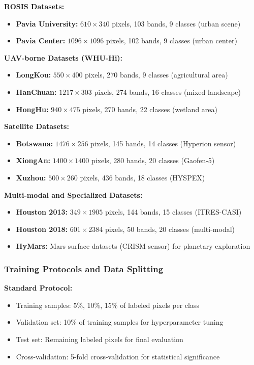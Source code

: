 \documentclass[journal]{IEEEtran}
\begin{document}
\textbf{ROSIS Datasets:}
\begin{itemize}
\item \textbf{Pavia University:} $610 \times 340$ pixels, 103 bands, 9 classes (urban scene)
\item \textbf{Pavia Center:} $1096 \times 1096$ pixels, 102 bands, 9 classes (urban center)
\end{itemize}

\textbf{UAV-borne Datasets (WHU-Hi):}
\begin{itemize}
\item \textbf{LongKou:} $550 \times 400$ pixels, 270 bands, 9 classes (agricultural area)
\item \textbf{HanChuan:} $1217 \times 303$ pixels, 274 bands, 16 classes (mixed landscape)
\item \textbf{HongHu:} $940 \times 475$ pixels, 270 bands, 22 classes (wetland area)
\end{itemize}

\textbf{Satellite Datasets:}
\begin{itemize}
\item \textbf{Botswana:} $1476 \times 256$ pixels, 145 bands, 14 classes (Hyperion sensor)
\item \textbf{XiongAn:} $1400 \times 1400$ pixels, 280 bands, 20 classes (Gaofen-5)
\item \textbf{Xuzhou:} $500 \times 260$ pixels, 436 bands, 18 classes (HYSPEX)
\end{itemize}

\textbf{Multi-modal and Specialized Datasets:}
\begin{itemize}
\item \textbf{Houston 2013:} $349 \times 1905$ pixels, 144 bands, 15 classes (ITRES-CASI)
\item \textbf{Houston 2018:} $601 \times 2384$ pixels, 50 bands, 20 classes (multi-modal)
\item \textbf{HyMars:} Mars surface datasets (CRISM sensor) for planetary exploration
\end{itemize}

\subsubsection{Training Protocols and Data Splitting}

\textbf{Standard Protocol:}
\begin{itemize}
\item Training samples: 5\%, 10\%, 15\% of labeled pixels per class
\item Validation set: 10\% of training samples for hyperparameter tuning
\item Test set: Remaining labeled pixels for final evaluation
\item Cross-validation: 5-fold cross-validation for statistical significance
\end{itemize}
\end{document}
